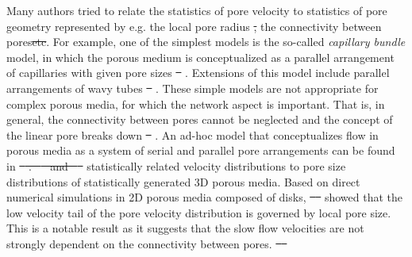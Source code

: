 \documentclass[draft]{agujournal2019}
\providecommand{\DIFadd}[1]{{\protect\color{blue}\uwave{#1}}} %
\providecommand{\DIFdel}[1]{{\protect\color{red}\sout{#1}}}                      %
\providecommand{\DIFaddbegin}{} %
\providecommand{\DIFaddend}{} %
\providecommand{\DIFdelbegin}{} %
\providecommand{\DIFdelend}{} %
\begin{document}
Many authors tried to relate the statistics of pore velocity to statistics of pore geometry represented by e.g. the local pore radius \DIFdelbegin \DIFdel{, }\DIFdelend \DIFaddbegin \DIFadd{and }\DIFaddend the connectivity between pores\DIFdelbegin \DIFdel{etc}\DIFdelend . For example, one of the simplest models is the so-called \emph{capillary bundle} model, in which the porous medium is conceptualized as a parallel arrangement of capillaries with given pore sizes \DIFdelbegin \DIFdel{\mbox{%
}%
}\DIFdelend \DIFaddbegin \DIFadd{\mbox{%
\cite{scheidegger_physics_1974}}%
}\DIFaddend . Extensions of this model include parallel arrangements of wavy tubes \DIFdelbegin \DIFdel{\mbox{%
}%
}\DIFdelend \DIFaddbegin \DIFadd{\mbox{%
\cite{le_borgne_effective_2011}}%
}\DIFaddend . These simple models are not appropriate for complex porous media, for which the network aspect is important. That is, in general, the connectivity between pores cannot be neglected and the concept of the linear pore breaks down \DIFdelbegin \DIFdel{\mbox{%
}%
}\DIFdelend \DIFaddbegin \DIFadd{\mbox{%
\cite{dentz_mechanisms_2018}}%
}\DIFaddend . An ad-hoc model that conceptualizes flow in porous media as a system of serial and parallel pore arrangements can be found in \DIFdelbegin \DIFdel{\mbox{%
\cite{holzner_intermittent_2015}}%
. \mbox{%
\cite{siena_relationship_2014} }%
and \mbox{%
\cite{hyman_heterogeneities_2012} }%
}\DIFdelend \DIFaddbegin \DIFadd{\mbox{%
\citeA{holzner_intermittent_2015}}%
. \mbox{%
\citeA{siena_relationship_2014} }%
and \mbox{%
\citeA{hyman_heterogeneities_2012} }%
}\DIFaddend statistically related velocity distributions to pore size distributions of statistically generated 3D porous media. Based on direct numerical simulations in 2D porous media composed of disks, \DIFdelbegin \DIFdel{\mbox{%
\cite{de_anna_prediction_2017} }%
}\DIFdelend \DIFaddbegin \DIFadd{\mbox{%
\citeA{de_anna_prediction_2017} }%
}\DIFaddend showed that the low velocity tail of the pore velocity distribution is governed by local pore size. This is a notable result as it suggests that the slow flow velocities are not strongly dependent on the connectivity between pores. \DIFdelbegin \DIFdel{\mbox{%
\cite{alim_local_2017} }%
}\DIFdelend \DIFaddbegin \DIFadd{\mbox{%
}}
\end{document}
